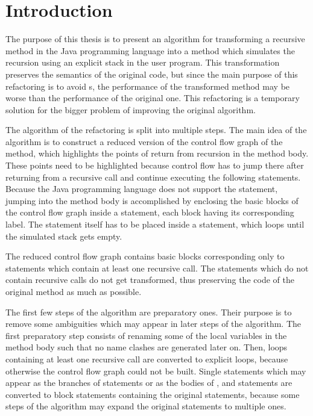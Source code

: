 \chapter{Introduction}

The purpose of this thesis is to present an algorithm for transforming a recursive method in the Java programming
language into a method which simulates the recursion using an explicit stack in the user program. This transformation
preserves the semantics of the original code, but since the main purpose of this refactoring\cite{refactoring}
is to avoid s, the performance of the transformed method may be worse than the performance of
the original one. This refactoring is a temporary solution for the bigger problem of improving the original algorithm.

The algorithm of the refactoring is split into multiple steps. The main idea of the algorithm is to construct a reduced
version of the control flow graph of the method, which highlights the points of return from recursion in the method
body. These points need to be highlighted because control flow has to jump there after returning from a recursive call
and continue executing the following statements. Because the Java programming language does not support the 
statement, jumping into the method body is accomplished by enclosing the basic blocks of the control flow graph inside
a  statement, each block having its corresponding  label. The  statement itself
has to be placed inside a  statement, which loops until the simulated stack gets empty.

The reduced control flow graph contains basic blocks corresponding only to statements which contain at least one
recursive call. The statements which do not contain recursive calls do not get transformed, thus preserving the code of
the original method as much as possible.

The first few steps of the algorithm are preparatory ones. Their purpose is to remove some ambiguities which may appear
in later steps of the algorithm. The first preparatory step consists of renaming some of the local variables in the
method body such that no name clashes are generated later on. Then,  loops containing at least one
recursive call are converted to explicit  loops, because otherwise the control flow graph could not be built.
Single statements which may appear as the branches of  statements or as the bodies of , 
and  statements are converted to block statements containing the original statements, because some steps
of the algorithm may expand the original statements to multiple ones.

